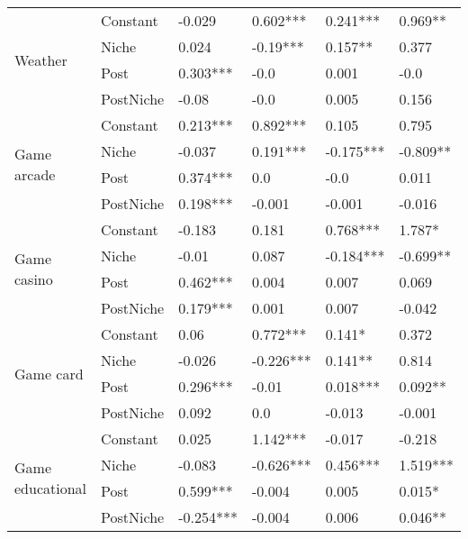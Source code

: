 \begin{longtable}[h!]{llllll}
\cline{1-6}
\multirow{4}{*}{Weather} & Constant &              -0.029 &    0.602*** &   0.241*** &    0.969** \\
          & Niche &               0.024 &    -0.19*** &    0.157** &      0.377 \\
          & Post &            0.303*** &        -0.0 &      0.001 &       -0.0 \\
          & PostNiche &               -0.08 &        -0.0 &      0.005 &      0.156 \\
\cline{1-6}
\multirow{4}{*}{Game arcade} & Constant &            0.213*** &    0.892*** &      0.105 &      0.795 \\
          & Niche &              -0.037 &    0.191*** &  -0.175*** &   -0.809** \\
          & Post &            0.374*** &         0.0 &       -0.0 &      0.011 \\
          & PostNiche &            0.198*** &      -0.001 &     -0.001 &     -0.016 \\
\cline{1-6}
\multirow{4}{*}{Game casino} & Constant &              -0.183 &       0.181 &   0.768*** &     1.787* \\
          & Niche &               -0.01 &       0.087 &  -0.184*** &   -0.699** \\
          & Post &            0.462*** &       0.004 &      0.007 &      0.069 \\
          & PostNiche &            0.179*** &       0.001 &      0.007 &     -0.042 \\
\cline{1-6}
\multirow{4}{*}{Game card} & Constant &                0.06 &    0.772*** &     0.141* &      0.372 \\
          & Niche &              -0.026 &   -0.226*** &    0.141** &      0.814 \\
          & Post &            0.296*** &       -0.01 &   0.018*** &    0.092** \\
          & PostNiche &               0.092 &         0.0 &     -0.013 &     -0.001 \\
\cline{1-6}
\multirow{4}{*}{Game educational} & Constant &               0.025 &    1.142*** &     -0.017 &     -0.218 \\
          & Niche &              -0.083 &   -0.626*** &   0.456*** &   1.519*** \\
          & Post &            0.599*** &      -0.004 &      0.005 &     0.015* \\
          & PostNiche &           -0.254*** &      -0.004 &      0.006 &    0.046** \\

\end{longtable}
